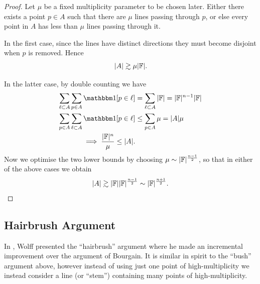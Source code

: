 \begin{proof}
    Let $\mu$ be a fixed multiplicity parameter to be chosen later. Either there exists a point $p\in A$ such that there are $\mu$ lines passing through $p$,
    or else every point in $A$ has less than $\mu$ lines passing through it.

    In the first case, since the lines have distinct directions they must become disjoint when $p$ is removed. Hence
    \[
      |A| \gtrsim \mu |\mathbb F| .
    \]

    In the latter case, by double counting we have
    \begin{align*}
         \sum_{\ell \subset A} \sum_{p \in A} \OO[p \in \ell] &= \sum_{\ell \subset A} |\FF| = |\FF|^{n-1} |\FF| \\
        \sum_{p \in A} \sum_{\ell \subset A} \OO[p \in \ell] &\leq \sum_{p \in A} \mu = |A|\mu \\
        \implies \frac{|\FF|^{n}}{\mu} \leq |A|.
    \end{align*}
    Now we optimise the two lower bounds by choosing $\mu \sim |\mathbb F|^{\frac{n-1}{2}}$, so that in either of the above cases we obtain
    \[
        |A| \gtrsim |\mathbb F||\mathbb F|^{\frac{n-1}{2}} \sim |\mathbb F|^{\frac{n+1}{2}}.
    \]

\end{proof}

\subsection{Hairbrush Argument}
In \cite{WOLFF1995}, Wolff presented the ``hairbrush'' argument where he made an incremental improvement over the argument of Bourgain. It is similar in spirit to the ``bush'' argument above, 
however instead of using just one point of high-multiplicity we instead consider a line (or ``stem'') containing many points of high-multiplicity.

